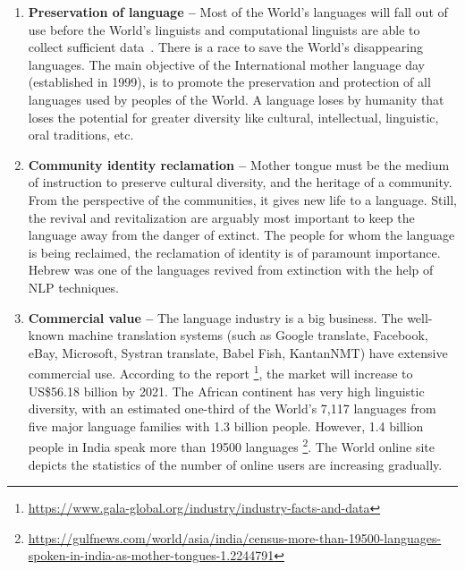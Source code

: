 \documentclass[manuscript,screen]{acmart}
\begin{document}
\begin{enumerate}
\item \textbf{Preservation of language --}
Most of the World’s languages will fall out of use before the World’s linguists and computational linguists are able to collect sufficient data~\cite{bird2012machine}. There is a race to save the World's disappearing languages. The main objective of the International mother language day (established in 1999), is to promote the preservation and protection of all languages used by peoples of the World. A language loses by humanity that loses the potential for greater diversity like cultural, intellectual, linguistic, oral traditions, etc.
\item \textbf{Community identity reclamation --}
Mother tongue must be the medium of instruction to preserve cultural diversity, and the heritage of a community. From the perspective of the communities, it gives new life to a language. Still, the revival and revitalization are arguably most important to keep the language away from the danger of extinct. The people for whom the language is being reclaimed, the reclamation of identity is of paramount importance. Hebrew was one of the languages revived from extinction with the help of NLP techniques.
\item \textbf{Commercial value --}
The language industry is a big business. The well-known machine translation systems (such as Google translate, Facebook, eBay, Microsoft, Systran translate, Babel Fish, KantanNMT) have extensive commercial use. According to the report \footnote { \url{https://www.gala-global.org/industry/industry-facts-and-data}}, the market will increase to US\$56.18 billion by 2021. The African continent has very high linguistic diversity, with an estimated one-third of the World’s 7,117 \citet{glottolog} languages from five major language families with 1.3 billion people. However, 1.4 billion people in India speak more than 19500 languages \footnote {\url{ https://gulfnews.com/world/asia/india/census-more-than-19500-languages-spoken-in-india-as-mother-tongues-1.2244791}}. The World online site depicts the statistics of the number of online users are increasing gradually.


\end{enumerate}
\end{document}
